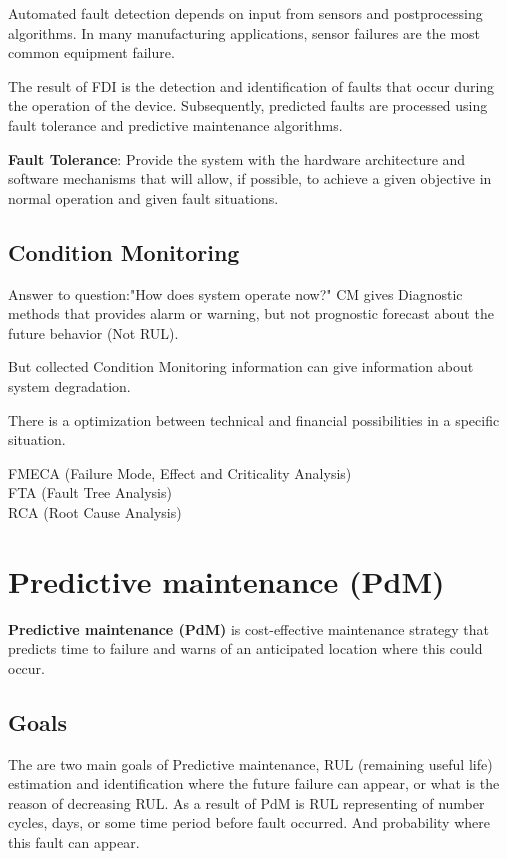 Automated fault detection depends on input from sensors and postprocessing
algorithms. In many manufacturing applications, sensor failures are the
most common equipment failure.


The result of FDI is the detection and identification of faults that occur
during the operation of the device. Subsequently, predicted faults are
processed using fault tolerance and predictive maintenance algorithms.

\textbf{Fault Tolerance}: Provide the system with the hardware architecture
and software mechanisms that will allow, if possible, to achieve a given
objective in normal operation and given fault situations.

\subsection{Condition Monitoring}
Answer to question:"How does system operate now?"
CM gives Diagnostic methods that provides alarm or warning, but not
prognostic forecast about the future behavior (Not RUL).

But collected Condition Monitoring information can give information about
system degradation.


There is a optimization between technical and financial possibilities in a
specific situation.

FMECA (Failure Mode, Effect and Criticality Analysis) \\
FTA (Fault Tree Analysis) \\
RCA (Root Cause Analysis) \\


% 


\section{Predictive maintenance (PdM)}
\textbf{Predictive maintenance (PdM)} is cost-effective maintenance strategy that
predicts time to failure and warns of an anticipated location where this
could occur.

\subsection{Goals}
The are two main goals of Predictive maintenance, RUL (remaining useful
life) estimation and identification where the future failure can appear, or what is
the reason of decreasing RUL. 
As a result of PdM is RUL representing of number cycles, days, or some time
period before fault occurred. And probability where this fault can appear.

